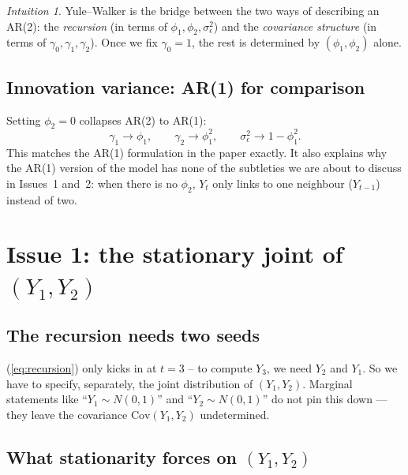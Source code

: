\documentclass[11pt]{article}
\newcommand{\eref}[1]{(\ref{#1})}
\theoremstyle{plain}
\theoremstyle{definition}
\theoremstyle{remark}
\newtheorem*{intuition}{Intuition}
\begin{document}
\begin{intuition}
Yule--Walker is the bridge between the two ways of describing an AR(2):
the \emph{recursion} (in terms of $\phi_1, \phi_2, \sigma_\epsilon^2$)
and the \emph{covariance structure} (in terms of $\gamma_0, \gamma_1,
\gamma_2$). Once we fix $\gamma_0 = 1$, the rest is determined by
$(\phi_1, \phi_2)$ alone.
\end{intuition}

\subsection{Innovation variance: AR(1) for comparison}\label{sec:ar1-vs-ar2}

Setting $\phi_2 = 0$ collapses AR(2) to AR(1):
\[
  \gamma_1 \to \phi_1, \qquad \gamma_2 \to \phi_1^2, \qquad
  \sigma_\epsilon^2 \to 1 - \phi_1^2.
\]
This matches the AR(1) formulation in the paper exactly. It also explains
why the AR(1) version of the model has none of the subtleties we are
about to discuss in Issues~1 and~2: when there is no $\phi_2$, $Y_t$ only
links to one neighbour ($Y_{t-1}$) instead of two.

\section{Issue 1: the stationary joint of \texorpdfstring{$(Y_1, Y_2)$}{(Y1, Y2)}}\label{sec:issue1}

\subsection{The recursion needs two seeds}\label{sec:two-seeds}

\eref{eq:recursion} only kicks in at $t = 3$ -- to compute $Y_3$, we need
$Y_2$ and $Y_1$. So we have to specify, separately, the joint
distribution of $(Y_1, Y_2)$. Marginal statements like ``$Y_1 \sim N(0,1)$''
and ``$Y_2 \sim N(0,1)$'' do not pin this down --- they leave the covariance
$\mathrm{Cov}(Y_1, Y_2)$ undetermined.

\subsection{What stationarity forces on \texorpdfstring{$(Y_1, Y_2)$}{(Y1, Y2)}}\label{sec:stationary-joint}
\end{document}
